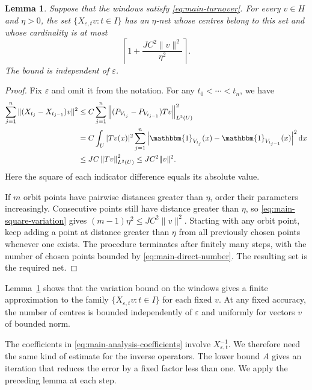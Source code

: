 \documentclass[12pt,reqno,tbtags]{amsart}
\newtheorem{lemma}{Lemma}[section]
\def\d{\mathrm{d}}
\newcommand\norm[1]{\|#1\|}
\newcommand\1{\mathbbm{1}}
\newcommand\Norm[2]{\left\|#1\right\|_{#2}}
\newcommand{\eps}{\varepsilon}
\def\d{\mathrm{d}}
\begin{document}
\begin{lemma}\label{lem:main-direct-cover}
Suppose that the windows satisfy \eqref{eq:main-turnover}. For every $v\in H$
and $\eta>0$, the set $\{X_{\eps,t}v:t\in I\}$ has an $\eta$-net whose
centres belong to this set and whose cardinality is at most
\begin{equation}\label{eq:main-direct-number}
    \left\lceil1+\frac{JC^2\norm{v}^2}{\eta^2}\right\rceil.
\end{equation}
The bound is independent of $\eps$.
\end{lemma}
\begin{proof}
Fix $\eps$ and omit it from the notation. For any $t_0<\cdots<t_n$, we have
\begin{equation}\label{eq:main-square-variation}
    \begin{aligned}
    \sum_{j=1}^{n}\norm{(X_{t_j}-X_{t_{j-1}})v}^2
    &\le C\sum_{j=1}^{n}
       \Norm{(P_{V_{t_j}}-P_{V_{t_{j-1}}})Tv}{L^2(U)}^2\\
    &=C\int_U|Tv(x)|^2\sum_{j=1}^{n}
       \left|\1_{V_{t_j}}(x)-\1_{V_{t_{j-1}}}(x)\right|^2\d x\\
    &\le JC\Norm{Tv}{L^2(U)}^2
     \le JC^2\norm{v}^2.
    \end{aligned}
\end{equation}
Here the square of each indicator difference equals its absolute value.

If $m$ orbit points have pairwise distances greater than $\eta$, order their
parameters increasingly. Consecutive points still have distance greater than
$\eta$, so \eqref{eq:main-square-variation} gives
$(m-1)\eta^2\le JC^2\norm{v}^2$.
Starting with any orbit point, keep adding a point at distance greater than
$\eta$ from all previously chosen points whenever one exists.
The procedure terminates after finitely many steps, with the number of chosen
points bounded by \eqref{eq:main-direct-number}. The resulting set is the required net.
\end{proof}

Lemma~\ref{lem:main-direct-cover} shows that the variation bound on the windows
gives a finite approximation to the family $\{X_{\eps,t}v:t\in I\}$ for each
fixed $v$. At any fixed accuracy, the number of centres is bounded independently
of $\eps$ and uniformly for vectors $v$ of bounded norm.

The coefficients in \eqref{eq:main-analysis-coefficients} involve $X_{\eps,t}^{-1}$.
We therefore need the same kind of estimate for the inverse operators.
The lower bound $A$ gives an iteration that reduces the error by a fixed
factor less than one. We apply the preceding lemma at each step.
\end{document}
